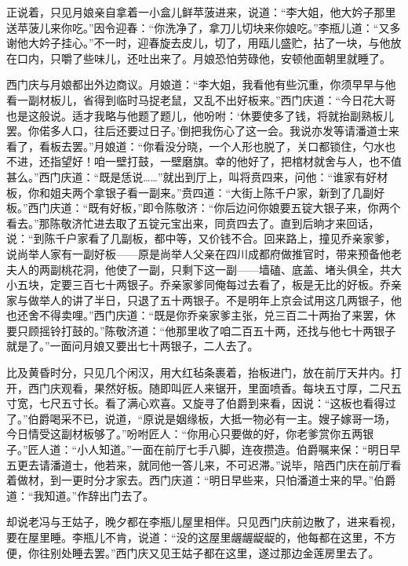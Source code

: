 正说着，只见月娘亲自拿着一小盒儿鲜苹菠进来，说道：“李大姐，他大妗子那里送苹菠儿来你吃。”因令迎春：“你洗净了，拿刀儿切块来你娘吃。”李瓶儿道：“又多谢他大妗子挂心。”不一时，迎春旋去皮儿，切了，用瓯儿盛贮，拈了一块，与他放在口内，只嚼了些味儿，还吐出来了。月娘恐怕劳碌他，安顿他面朝里就睡了。

西门庆与月娘都出外边商议。月娘道：“李大姐，我看他有些沉重，你须早早与他看一副材板儿，省得到临时马捉老鼠，又乱不出好板来。”西门庆道：“今日花大哥也是这般说。适才我略与他题了题儿，他吩咐：‘休要使多了钱，将就抬副熟板儿罢。你偌多人口，往后还要过日子。’倒把我伤心了这一会。我说亦发等请潘道士来看了，看板去罢。”月娘道：“你看没分晓，一个人形也脱了，关口都锁住，勺水也不进，还指望好！咱一壁打鼓，一壁磨旗。幸的他好了，把棺材就舍与人，也不值甚么。”西门庆道：“既是恁说……”就出到厅上，叫将贲四来，问他：“谁家有好材板，你和姐夫两个拿银子看一副来。”贲四道：“大街上陈千户家，新到了几副好板。”西门庆道：“既有好板，”即令陈敬济：“你后边问你娘要五锭大银子来，你两个看去。”那陈敬济忙进去取了五锭元宝出来，同贲四去了。直到后晌才来回话，说：“到陈千户家看了几副板，都中等，又价钱不合。回来路上，撞见乔亲家爹，说尚举人家有一副好板——原是尚举人父亲在四川成都府做推官时，带来预备他老夫人的两副桃花洞，他使了一副，只剩下这一副——墙磕、底盖、堵头俱全，共大小五块，定要三百七十两银子。乔亲家爹同俺每过去看了，板是无比的好板。乔亲家与做举人的讲了半日，只退了五十两银子。不是明年上京会试用这几两银子，他也还舍不得卖哩。”西门庆道：“既是你乔亲家爹主张，兑三百二十两抬了来罢，休要只顾摇铃打鼓的。”陈敬济道：“他那里收了咱二百五十两，还找与他七十两银子就是了。”一面问月娘又要出七十两银子，二人去了。

比及黄昏时分，只见几个闲汉，用大红毡条裹着，抬板进门，放在前厅天井内。打开，西门庆观看，果然好板。随即叫匠人来锯开，里面喷香。每块五寸厚，二尺五寸宽，七尺五寸长。看了满心欢喜。又旋寻了伯爵到来看，因说：“这板也看得过了。”伯爵喝采不已，说道，“原说是姻缘板，大抵一物必有一主。嫂子嫁哥一场，今日情受这副材板够了。”吩咐匠人：“你用心只要做的好，你老爹赏你五两银子。”匠人道：“小人知道。”一面在前厅七手八脚，连夜攒造。伯爵嘱来保：“明日早五更去请潘道士，他若来，就同他一答儿来，不可迟滞。”说毕，陪西门庆在前厅看着做材，到一更时分才家去。西门庆道：“明日早些来，只怕潘道士来的早。”伯爵道：“我知道。”作辞出门去了。

却说老冯与王姑子，晚夕都在李瓶儿屋里相伴。只见西门庆前边散了，进来看视，要在屋里睡。李瓶儿不肯，说道：“没的这屋里龌龌龊龊的，他每都在这里，不方便，你往别处睡去罢。”西门庆又见王姑子都在这里，遂过那边金莲房里去了。

